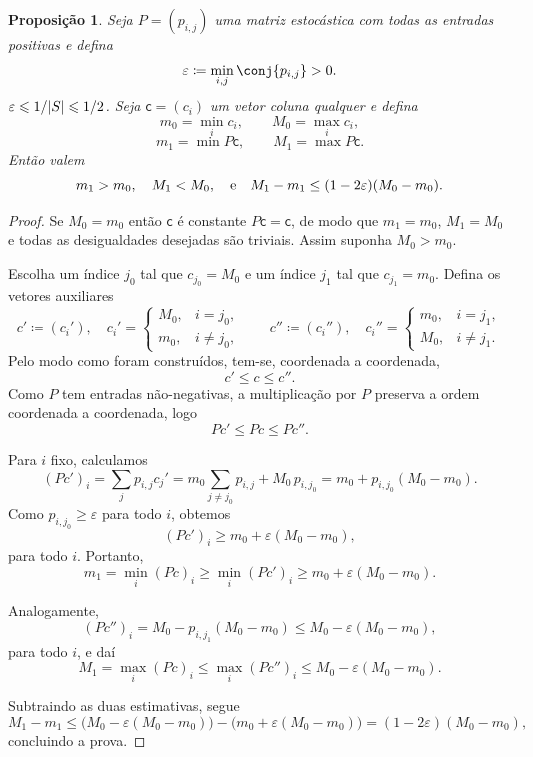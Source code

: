 \documentclass[12pt,letterpaper]{article}
\newtheorem{proposicao}[teorema] {Proposição}
\begin{document}
\begin{proposicao}
Seja $P=(p_{i,j})$ uma matriz estocástica com todas as entradas
positivas e defina
\[
  \vareps \eqdef \min_{i,j}\conj{p_{i,j}}>0.
\]
$\varepsilon \leqslant 1/|S| \leqslant 1/2$.
Seja $\mathsf{c}=(c_i)$ um vetor \emph{coluna} qualquer e defina
\[
  m_0 = \min_i c_i, \qquad M_0 = \max_i c_i,
\]
\[
  m_1 = \min P\mathsf{c}, \qquad M_1 = \max P\mathsf{c}.
\]
Então valem
\[
  m_1 > m_0, \quad M_1 < M_0, \quad\text{e}\quad
  M_1 - m_1 \le (1 - 2\varepsilon)(M_0 - m_0).
\]
\end{proposicao}
\begin{proof}
  Se $M_0=m_0$ então $\mathsf{c}$ é constante $P\mathsf{c}=\mathsf{c}$,
  de modo que $m_1= m_0$, $M_1 = M_0$ e todas as desigualdades
  desejadas são triviais. Assim suponha $M_0 > m_0$.
 
  Escolha um índice $j_0$ tal que $c_{j_0} = M_0$ e um índice $j_1$ tal
  que $c_{j_1} = m_0$. Defina os vetores auxiliares
  \[
    c' \coloneqq (c_i'), \quad 
    c_i' =
    \begin{cases}
      M_0, & i = j_0,\\
      m_0, & i \neq j_0,
    \end{cases}
    \qquad
    c'' \coloneqq (c_i''), \quad
    c_i'' =
    \begin{cases}
      m_0, & i = j_1,\\
      M_0, & i \neq j_1.
    \end{cases}
  \]
  Pelo modo como foram construídos, tem-se, coordenada a coordenada,
  \[
    c' \le c \le c''.
  \]
  Como $P$ tem entradas não-negativas, a multiplicação por $P$ preserva
  a ordem coordenada a coordenada, logo
  \[
    Pc' \le Pc \le Pc''.
  \]
  
  Para $i$ fixo, calculamos
  \[
    (Pc')_i = \sum_j p_{i,j} c_j'
    = m_0 \sum_{j \ne j_0} p_{i,j} + M_0\, p_{i,j_0}
    = m_0 + p_{i,j_0}(M_0 - m_0).
  \]
  Como $p_{i,j_0} \ge \varepsilon$ para todo $i$, obtemos
  \[
    (Pc')_i \ge m_0 + \varepsilon (M_0 - m_0),
  \]
  para todo $i$. Portanto,
  \[
    m_1 = \min_i (Pc)_i \ge \min_i (Pc')_i 
    \ge m_0 + \varepsilon (M_0 - m_0).
  \]
  
  Analogamente,
  \[
    (Pc'')_i = M_0 - p_{i,j_1}(M_0 - m_0)
    \le M_0 - \varepsilon (M_0 - m_0),
  \]
  para todo $i$, e daí
  \[
    M_1 = \max_i (Pc)_i \le \max_i (Pc'')_i 
    \le M_0 - \varepsilon (M_0 - m_0).
  \]
  
  Subtraindo as duas estimativas, segue
  \[
    M_1 - m_1 
    \le \big(M_0 - \varepsilon (M_0 - m_0)\big)
    - \big(m_0 + \varepsilon (M_0 - m_0)\big)
    = (1 - 2\varepsilon)(M_0 - m_0),
  \]
  concluindo a prova.
\end{proof}
\end{document}
